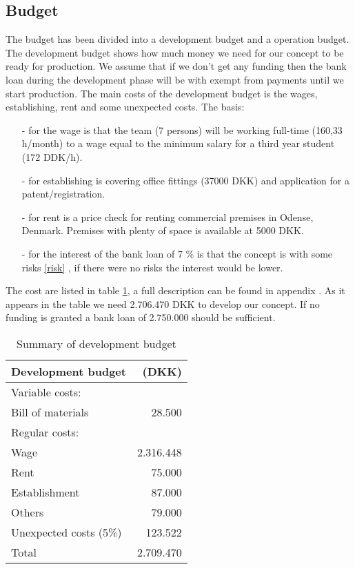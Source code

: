 \subsection{Budget}
\label{budget_label}
The budget has been divided into a development budget and a operation budget. The development budget  shows how much money we need for our concept to be ready for production. We assume that if we don't get any funding then the bank loan during the development phase will be with exempt from payments until we start production. The main costs of the development budget is the wages, establishing, rent and some unexpected costs. 
The basis: \begin{itemize}
\item[-] for the wage is that the team (7 persons) will be working full-time (160,33 h/month) to a wage equal to the minimum salary for a third year student (172 DDK/h\cite{ida-salary}).
\item[-] for establishing is covering office fittings (37000 DKK) and application for a patent/registration.
\item[-] for rent is a price check for renting commercial premises in Odense, Denmark. Premises with plenty of space is available at 5000 DKK.\cite{rent_prices}
\item[-] for the interest of the bank loan of 7 \% is that the concept is with some risks \ref{risk} , if there were no risks the interest would be lower. 
\end{itemize} 
The cost are listed in table \ref{devbud}, a full description can be found in appendix . As it appears in the table we need 2.706.470 DKK to develop our concept. If no funding is granted a bank loan of 2.750.000 should be sufficient.

\begin{table}[h!]
\centering
\begin{tabular}{l r}
Development budget      & (DKK)\\
\hline                  
Variable costs:         &  \\
Bill of materials       &  28.500  \\
Regular costs:          &  \\
Wage                    &  2.316.448\\
Rent                    &  75.000\\
Establishment           &  87.000\\
Others                  &  79.000\\
Unexpected costs (5\%)  &  123.522\\
\hline                    
Total                   &  2.709.470\\
\end{tabular}
\caption{Summary of development budget}
\label{devbud}
\end{table}

